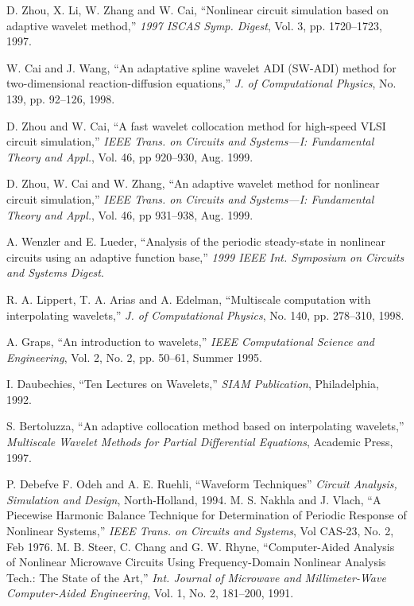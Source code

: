 \begin{thebibliography}{99}
 D. Zhou, X. Li, W. Zhang and W. Cai, ``Nonlinear
circuit simulation based on adaptive wavelet method,'' \emph{1997
ISCAS Symp. Digest}, Vol. 3, pp. 1720--1723, 1997.

 W. Cai and J. Wang, ``An adaptative spline wavelet
ADI (SW-ADI) method for two-dimensional reaction-diffusion
equations,'' \emph{J. of Computational Physics}, No. 139, pp. 92--126,
1998.

 D. Zhou and W. Cai, ``A fast wavelet
collocation method for high-speed VLSI circuit simulation,''
\emph{IEEE Trans. on Circuits and Systems---I: Fundamental Theory and
Appl.}, Vol. 46, pp 920--930, Aug. 1999.

 D. Zhou, W. Cai and W. Zhang, ``An adaptive
wavelet method for nonlinear circuit simulation,'' \emph{IEEE
Trans. on Circuits and Systems---I: Fundamental Theory and Appl.},
Vol. 46, pp 931--938, Aug. 1999.

 A. Wenzler and E. Lueder, ``Analysis of the periodic
steady-state in nonlinear circuits using an adaptive function base,''
\emph{1999 IEEE Int. Symposium on Circuits and Systems Digest}.

 R. A. Lippert, T. A. Arias and A. Edelman,
``Multiscale computation with interpolating wavelets,'' \emph{J. of
Computational Physics}, No. 140, pp. 278--310, 1998.

 A. Graps, ``An introduction to wavelets,''
\emph{IEEE Computational Science and Engineering}, Vol. 2, No. 2,
pp. 50--61, Summer 1995.

 I. Daubechies, ``Ten Lectures on Wavelets,''
\emph{SIAM Publication}, Philadelphia, 1992.

 S. Bertoluzza, ``An adaptive collocation
method based on interpolating wavelets,'' \emph{Multiscale Wavelet
Methods for Partial Differential Equations}, Academic Press, 1997.

 P. Debefve F. Odeh and A. E. Ruehli, ``Waveform
Techniques'' \emph{Circuit Analysis, Simulation and Design},
North-Holland, 1994.
%
 M. S. Nakhla and J. Vlach, ``A Piecewise
Harmonic Balance Technique for Determination of Periodic Response of
Nonlinear Systems,'' \emph{IEEE Trans. on Circuits and Systems}, Vol
CAS-23, No. 2, Feb 1976.
%
 M. B. Steer, C. Chang and G. W. Rhyne,
``Computer-Aided Analysis of Nonlinear Microwave Circuits Using
Frequency-Domain Nonlinear Analysis Tech.: The State of the
Art,'' \emph{Int. Journal of Microwave and Millimeter-Wave
Computer-Aided Engineering}, Vol. 1, No. 2, 181--200, 1991.


\end{thebibliography}
